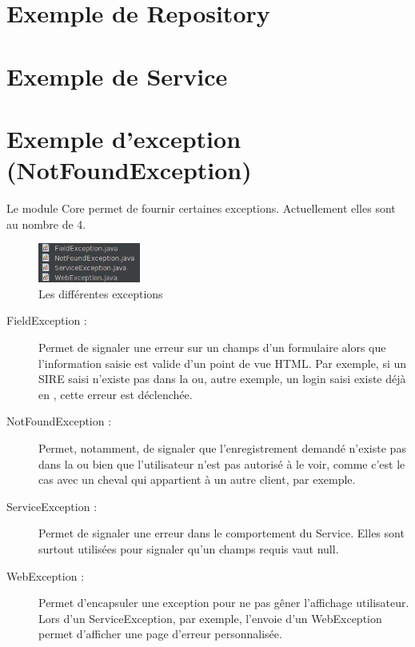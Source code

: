 	\section{Exemple de Repository}

	\section{Exemple de Service}

	\section{Exemple d'exception (NotFoundException)}
		Le module Core permet de fournir certaines exceptions. Actuellement elles sont au nombre de 4.

		\begin{figure}[H]
			\centering\includegraphics[width=0.30\textwidth, keepaspectratio]{res/exceptions.png}
			\caption{Les différentes exceptions}
		\end{figure}

		\begin{description}
			\item[FieldException :]{Permet de signaler une erreur sur un champs d'un formulaire alors que l'information saisie est valide d'un point de vue HTML. Par exemple, si un SIRE saisi n'existe pas dans la \bdd{} ou, autre exemple, un login saisi existe déjà en \bdd{}, cette erreur est déclenchée.}
			\item[NotFoundException :]{Permet, notamment, de signaler que l'enregistrement demandé n'existe pas dans la \bdd{} ou bien que l'utilisateur n'est pas autorisé à le voir, comme c'est le cas avec un cheval qui appartient à un autre client, par exemple.}
			\item[ServiceException :]{Permet de signaler une erreur dans le comportement du Service. Elles sont surtout utilisées pour signaler qu'un champs requis vaut null.}
			\item[WebException :]{Permet d'encapsuler une exception pour ne pas gêner l'affichage utilisateur. Lors d'un ServiceException, par exemple, l'envoie d'un WebException permet d'afficher une page d'erreur personnalisée.}
		\end{description}

